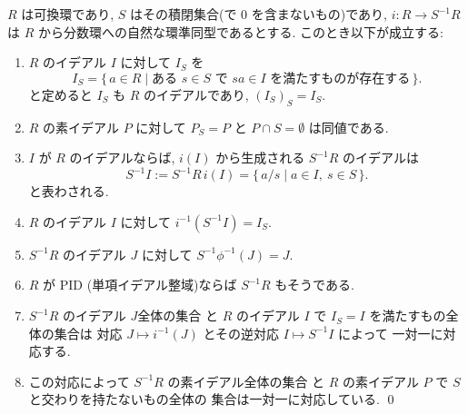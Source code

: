 \documentclass[12pt,twoside]{jarticle}
\begin{document}
\begin{question}[分数環のイデアル, 20点]
\label{q:Ideal(S^{-1}R)}
 $R$ は可換環であり, $S$ はその積閉集合(で $0$ を含まないもの)であり, 
 $i:R\to S^{-1}R$ は $R$ から分数環への自然な環準同型であるとする.
 このとき以下が成立する:
 \begin{enumerate}
  \item $R$ のイデアル $I$ に対して $I_S$ を
   \begin{equation*}
    I_S =
    \{\, a\in R \mid 
    \text{ある $s\in S$ で $sa\in I$ を満たすものが存在する} \,\}.
   \end{equation*}
   と定めると $I_S$ も $R$ のイデアルであり, $(I_S)_S=I_S$.
  \item $R$ の素イデアル $P$ に対して %
   $P_S=P$ と $P\cap S=\emptyset$ は同値である.
  \item $I$ が $R$ のイデアルならば, %
   $i(I)$ から生成される $S^{-1}R$ のイデアルは
   \begin{equation*}
    S^{-1}I := S^{-1}R\,i(I) = \{\, a/s \mid a\in I,\ s\in S\,\}.
   \end{equation*}
   と表わされる.
  \item $R$ のイデアル $I$ に対して $i^{-1}(S^{-1}I)=I_S$.
  \item $S^{-1}R$ のイデアル $J$ に対して $S^{-1}\phi^{-1}(J)=J$.
  \item $R$ が PID (単項イデアル整域)ならば $S^{-1}R$ もそうである.
  \item $S^{-1}R$ のイデアル $J $全体の集合
   と $R$ のイデアル $I$ で $I_S=I$ を満たすもの全体の集合は
   対応 $J\mapsto i^{-1}(J)$ とその逆対応 $I\mapsto S^{-1}I$ によって
   一対一に対応する.
  \item この対応によって $S^{-1}R$ の素イデアル全体の集合
   と $R$ の素イデアル $P$ で $S$ と交わりを持たないもの全体の
   集合は一対一に対応している.
  \qed
 \end{enumerate}
\end{question}
\end{document}
